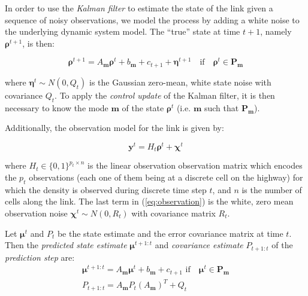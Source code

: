 In order to use the \textit{Kalman filter} to estimate the state of the link given a sequence of noisy observations, we model the process by adding a white noise to the underlying dynamic system model. The ``true'' state at time $t+1$, namely $\boldsymbol\rho^{t+1}$, is then:

\begin{equation}
\boldsymbol\rho^{t+1} = A_{\boldsymbol m} \boldsymbol\rho^{t} + b_{\boldsymbol m} + c_{t+1} + \boldsymbol\eta^{t+1} \quad\text{if}\quad\boldsymbol\rho^{t}\in\textbf{P}_{\boldsymbol m}
\label{eq:underlyingSystemDN3}
\end{equation}

\noindent where $\boldsymbol\eta^{t}\sim N(0,Q_{t})$ is the Gaussian zero-mean, white state noise with covariance $Q_{t}$. To apply the \textit{control update} of the Kalman filter, it is then necessary to know the mode $\boldsymbol m$ of the state $\boldsymbol\rho^{t}$ (i.e. $\boldsymbol m$ such that $\textbf{P}_{\boldsymbol m}$).

Additionally, the observation model for the link is given by:

\begin{equation}
\boldsymbol y^{t} = H_{t}\boldsymbol\rho^{t} + \boldsymbol\chi^{t}
\label{eq:observation}
\end{equation}

\noindent where $H_{t}\in \{ 0,1 \}^{p_{t}\times n}$ is the linear observation observation matrix which encodes the $p_{t}$ observations (each one of them being at a discrete cell on the highway) for which the density is observed during discrete time step $t$, and $n$ is the number of cells along the link. The last term in (\ref{eq:observation}) is the white, zero mean observation noise $\boldsymbol\chi^{t} \sim N(0,R_{t})$ with covariance matrix $R_{t}$.

\noindent Let $\boldsymbol\mu^{t}$ and $P_{t}$ be the state estimate and the error covariance matrix at time $t$. Then the \emph{predicted state estimate} $\boldsymbol\mu^{t+1:t}$ and \emph{covariance estimate} $P_{t+1:t}$ of the \emph{prediction step} are:
\begin{equation}
\begin{array}{l}
\boldsymbol\mu^{t+1:t} = A_{\boldsymbol m} \boldsymbol\mu^{t} + b_{\boldsymbol m} + c_{t+1}\text{ if}\quad\boldsymbol\mu^{t}\in\textbf{P}_{\boldsymbol m}\\
P_{t+1:t} = A_{\boldsymbol m}P_{t}(A_{\boldsymbol m})^{T} + Q_{t}
\end{array}
\label{eq:predict}
\end{equation}

